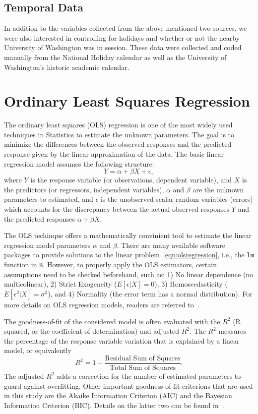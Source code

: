 \documentclass [11pt, proquest] {uwthesis}[2015/03/03]
\begin{document}
\subsection{Temporal Data}
In addition to the variables collected from the above-mentioned two sources, we were also interested in controlling for holidays and whether or not the nearby University of Washington was in session. These data were collected and coded manually from the National Holiday calendar as well as the University of Washington's historic academic calendar.


\section{Ordinary Least Squares Regression}
The ordinary least squares (OLS) regression is one of the most widely used techniques in Statistics to estimate the unknown parameters. The goal is to minimize the differences between the observed responses and the predicted response given by the linear approximation of the data. The basic linear regression model assumes the following structure:
\begin{equation}
Y = \alpha + \beta X + \epsilon, \label{eqn:olsregression}
\end{equation}
where $Y$ is the response variable (or observations, dependent variable), and $X$ is the predictors (or regressors, independent variables), $\alpha$ and $\beta$ are the unknown parameters to estimated, and $\epsilon$ is the unobserved scalar random variables (errors) which accounts for the discrepancy between the actual observed responses $Y$ and the predicted responses $\alpha + \beta X$.  

The OLS techinque offers a mathematically convinient tool to estimate the linear regression model parameters $\alpha$ and $\beta$. There are many available software packages to provide solutions to the linear problem~\eqref{eqn:olsregression}, i.e., the \texttt{lm} function in \texttt{R}. However, to properly apply the OLS estimators, certain assumptions need to be checked beforehand, such as: 1) No linear dependence (no multicolinear), 2) Strict Exogeneity ($E[\epsilon|X]=0$), 3) Homoscedasticity ($E[\epsilon^2|X]=\sigma^2$), and 4) Normality (the error term has a normal distribution). For more details on OLS regression models, readers are referred to~\cite{}.

The goodness-of-fit of the considered model is often evaluated with the $R^2$ (R squared, or the coefficient of determination) and adjusted $R^2$. The $R^2$ measures the percentage of the response variable variation that is explained by a linear model, or equivalently
\begin{equation}
R^2 = 1- \frac{\text{Residual Sum of Squares}}{\text{Total Sum of Squares}}.\label{eqn:R2}
\end{equation}
The adjusted $R^2$ adds a correction for the number of estimated parameters to guard against overfitting. Other important goodness-of-fit criterions that are used in this study are the Akaike Information Criterion (AIC) and the Bayesian Information Criterion (BIC). Details on the latter two can be found in~\cite{}.
\end{document}

